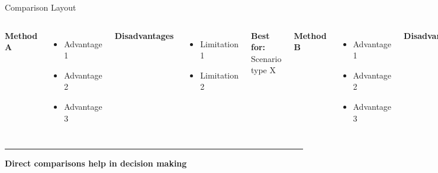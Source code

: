 \documentclass[8pt,aspectratio=169]{beamer}
\newcommand{\bottomnote}[1]{%
\vfill
\vspace{-2mm}
\textcolor{mllavender2}{\rule{\textwidth}{0.4pt}}
\vspace{1mm}
\footnotesize
\textbf{#1}
}
\begin{document}
\begin{frame}[t]{Comparison Layout}
\begin{columns}[T]
\textbf{Method A}
\begin{itemize}
\item Advantage 1
\item Advantage 2
\item Advantage 3
\end{itemize}

\textbf{Disadvantages}
\begin{itemize}
\item Limitation 1
\item Limitation 2
\end{itemize}

\textbf{Best for:} Scenario type X

\textbf{Method B}
\begin{itemize}
\item Advantage 1
\item Advantage 2
\item Advantage 3
\end{itemize}

\textbf{Disadvantages}
\begin{itemize}
\item Limitation 1
\item Limitation 2
\end{itemize}

\textbf{Best for:} Scenario type Y
\end{columns}

\bottomnote{Direct comparisons help in decision making}
\end{frame}
\end{document}
